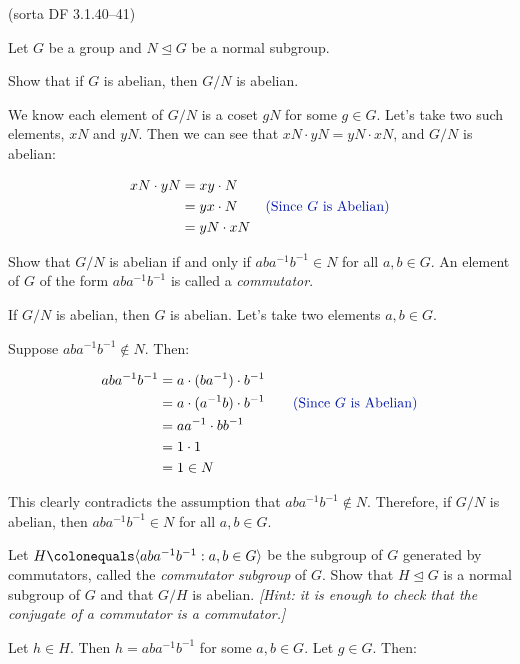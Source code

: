 \begin{problem}{(\textsf{sorta DF 3.1.40--41})}

  \noindent
  Let $G$ be a group and $N \trianglelefteq G$ be a normal subgroup.  
  \begin{enumalph}
    \item Show that if $G$ is abelian, then $G/N$ is abelian.
    \begin{Answer}
      We know each element of $G/N$ is a coset $gN$ for some $g \in G$.
      Let's take two such elements, $xN$ and $yN$.
      Then we can see that $xN \cdot yN = yN \cdot xN$, and $G/N$ is abelian:

      \begin{align*}
        xN \cdot yN &= xy \cdot N \\
        &= yx \cdot N\qquad \zaff{\text{(Since $G$ is Abelian)}} \\
        &= yN \cdot xN
      \end{align*}
    \end{Answer}
    \item Show that $G/N$ is abelian if and only if $aba^{-1}b^{-1} \in N$ for all $a,b
    \in G$.  An element of $G$ of the form $aba^{-1}b^{-1}$
    is called a \emph{commutator}.
    \begin{Answer}
      If $G/N$ is abelian, then $G$ is abelian.
      Let's take two elements $a,b \in G$.

      Suppose $aba^{-1}b^{-1} \not \in N$.
      Then:

      \begin{align*}
        aba^{-1}b^{-1} &= a \cdot (ba^{-1}) \cdot b^{-1} \\
        &= a \cdot (a^{-1}b) \cdot b^{-1} \qquad \zaff{\text{(Since $G$ is Abelian)}} \\
        &= aa^{-1} \cdot bb^{-1} \\
        &= 1 \cdot 1 \\
        &= 1 \in N
      \end{align*}

      This clearly contradicts the assumption that $aba^{-1}b^{-1} \not \in N$.
      Therefore, if $G/N$ is abelian, then $aba^{-1}b^{-1} \in N$ for all $a,b \in G$.
    \end{Answer} 
    \item Let $H \colonequals \langle aba^{-1}b^{-1} : a,b \in G \rangle$ be the 
    subgroup of $G$ generated by commutators, called the \emph{commutator subgroup} of 
    $G$.  Show that $H \trianglelefteq G$ is a normal subgroup of $G$ and that $G/H$ is
    abelian.  \emph{[Hint: it is enough to check that the conjugate of a commutator is 
    a commutator.]}
    \begin{Answer}
      Let $h \in H$.
      Then $h = aba^{-1}b^{-1}$ for some $a,b \in G$.
      Let $g \in G$.
      Then:


\end{Answer}
\end{enumalph}
\end{problem}
